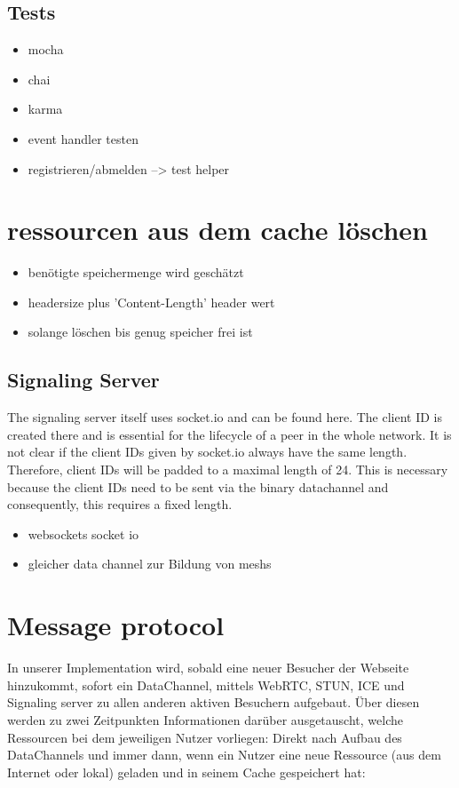 \subsection{Tests}

\begin{itemize}
  \item mocha
  \item chai
  \item karma
  \item event handler testen
  \item registrieren/abmelden --> test helper
\end{itemize}


\section{ressourcen aus dem cache löschen}

\begin{itemize}
  \item benötigte speichermenge wird geschätzt
  \item headersize plus 'Content-Length' header wert
  \item solange löschen bis genug speicher frei ist
\end{itemize}


\subsection{Signaling Server}
The signaling server itself uses socket.io and can be found here. The client ID is created there and is essential for the lifecycle of a peer in the whole network. It is not clear if the client IDs given by socket.io always have the same length. Therefore, client IDs will be padded to a maximal length of 24. This is necessary because the client IDs need to be sent via the binary datachannel and consequently, this requires a fixed length.


\begin{itemize}
  \item websockets socket io
  \item gleicher data channel zur Bildung von meshs
\end{itemize}


\section{Message protocol}
In unserer Implementation wird, sobald eine neuer Besucher der Webseite hinzukommt, sofort ein DataChannel, mittels WebRTC, STUN, ICE und Signaling server zu allen anderen aktiven Besuchern aufgebaut. Über diesen werden zu zwei Zeitpunkten Informationen darüber ausgetauscht, welche Ressourcen bei dem jeweiligen Nutzer vorliegen: Direkt nach Aufbau des DataChannels und immer dann, wenn ein Nutzer eine neue Ressource (aus dem Internet oder lokal) geladen und in seinem Cache gespeichert hat:

